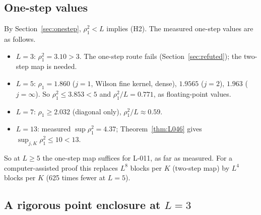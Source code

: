 \subsection{One-step values}\label{sec:numonestep}

By Section~\ref{sec:onestep}, $\rho_1^2<L$ implies (H2). The measured one-step values are as follows.
\begin{itemize}
\item $L=3$: $\rho_1^2=3.10>3$. The one-step route fails (Section~\ref{sec:refuted}); the two-step map is needed.
\item $L=5$: $\rho_1=1.860$ ($j=1$, Wilson fine kernel, dense), $1.9565$ ($j=2$), $1.963$ ($j=\infty$). So $\rho_1^2\le3.853<5$ and $\rho_1^2/L=0.771$, as floating-point values.
\item $L=7$: $\rho_1\ge2.032$ (diagonal only), $\rho_1^2/L\approx0.59$.
\item $L=13$: measured $\sup\rho_1^2=4.37$; Theorem~\ref{thm:L046} gives $\sup_{j,K}\rho_1^2\le10<13$.
\end{itemize}
So at $L\ge5$ the one-step map suffices for L-011, as far as measured. For a computer-assisted proof this replaces $L^8$ blocks per $K$ (two-step map) by $L^4$ blocks per $K$ (625 times fewer at $L=5$).

\subsection{A rigorous point enclosure at $L=3$}\label{sec:enclosure}

